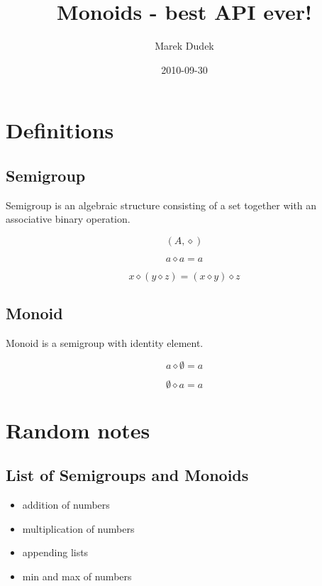 \documentclass{article}
\title{Monoids - best API ever!}
\date{2010-09-30}
\author{Marek Dudek}
\begin{document}
\maketitle

\newpage
\tableofcontents

\newpage
{}

\section{Definitions}

\subsection{Semigroup}

Semigroup is an algebraic structure consisting of a set together with an associative binary operation.

\begin{equation}
    (A, \diamond)
\end{equation}

\begin{equation}
    a \diamond a = a
\end{equation}

\begin{equation}
    x \diamond (y \diamond z) = (x \diamond y) \diamond z
\end{equation}

\subsection{Monoid}

Monoid is a semigroup with identity element.

\begin{equation}
    a \diamond \emptyset = a
\end{equation}

\begin{equation}
    \emptyset \diamond a = a
\end{equation}




\newpage
\section{Random notes}
\subsection{List of Semigroups and Monoids}

\begin{itemize}
    \item addition of numbers
    \item multiplication of numbers
    \item appending lists
    \item min and max of numbers
\end{itemize}
\end{document}
